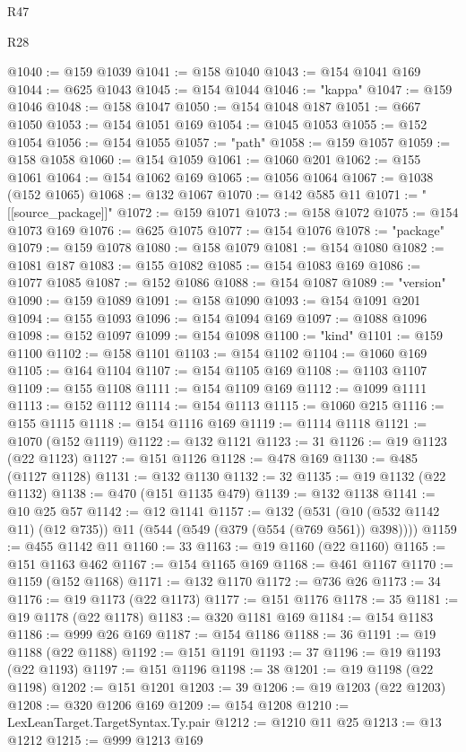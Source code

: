 \begin{lexlean}{R47}
\begin{lexlean}{R28}
\begin{coremodule}
{{{{{{{{{{{{{{{{{{{{{{{{{{{{{{{{{{{{{{{{{{{{{{{{{{{{{{{{{{{{{{{{{{{{{{{{{{{{{{{{{{{{{{{{{{{{{{{{{{{{{{{{{{{{{{{{{{{{{{{{{{{{{{{{{{{{{@1040 := @159 @1039
@1041 := @158 @1040
@1043 := @154 @1041 @169
@1044 := @625 @1043
@1045 := @154 @1044
@1046 := "kappa"
@1047 := @159 @1046
@1048 := @158 @1047
@1050 := @154 @1048 @187
@1051 := @667 @1050
@1053 := @154 @1051 @169
@1054 := @1045 @1053
@1055 := @152 @1054
@1056 := @154 @1055
@1057 := "path"
@1058 := @159 @1057
@1059 := @158 @1058
@1060 := @154 @1059
@1061 := @1060 @201
@1062 := @155 @1061
@1064 := @154 @1062 @169
@1065 := @1056 @1064
@1067 := @1038 (@152 @1065)
@1068 := @132 @1067
@1070 := @142 @585 @11
@1071 := "[[source_package]]"
@1072 := @159 @1071
@1073 := @158 @1072
@1075 := @154 @1073 @169
@1076 := @625 @1075
@1077 := @154 @1076
@1078 := "package"
@1079 := @159 @1078
@1080 := @158 @1079
@1081 := @154 @1080
@1082 := @1081 @187
@1083 := @155 @1082
@1085 := @154 @1083 @169
@1086 := @1077 @1085
@1087 := @152 @1086
@1088 := @154 @1087
@1089 := "version"
@1090 := @159 @1089
@1091 := @158 @1090
@1093 := @154 @1091 @201
@1094 := @155 @1093
@1096 := @154 @1094 @169
@1097 := @1088 @1096
@1098 := @152 @1097
@1099 := @154 @1098
@1100 := "kind"
@1101 := @159 @1100
@1102 := @158 @1101
@1103 := @154 @1102
@1104 := @1060 @169
@1105 := @164 @1104
@1107 := @154 @1105 @169
@1108 := @1103 @1107
@1109 := @155 @1108
@1111 := @154 @1109 @169
@1112 := @1099 @1111
@1113 := @152 @1112
@1114 := @154 @1113
@1115 := @1060 @215
@1116 := @155 @1115
@1118 := @154 @1116 @169
@1119 := @1114 @1118
@1121 := @1070 (@152 @1119)
@1122 := @132 @1121
@1123 := 31
@1126 := @19 @1123 (@22 @1123)
@1127 := @151 @1126
@1128 := @478 @169
@1130 := @485 (@1127 @1128)
@1131 := @132 @1130
@1132 := 32
@1135 := @19 @1132 (@22 @1132)
@1138 := @470 (@151 @1135 @479)
@1139 := @132 @1138
@1141 := @10 @25 @57
@1142 := @12 @1141
@1157 := @132
    (@531 (@10 (@532 @1142 @11) (@12 @735)) @11 (@544 (@549 (@379 (@554 (@769 @561)) @398))))
@1159 := @455 @1142 @11
@1160 := 33
@1163 := @19 @1160 (@22 @1160)
@1165 := @151 @1163 @462
@1167 := @154 @1165 @169
@1168 := @461 @1167
@1170 := @1159 (@152 @1168)
@1171 := @132 @1170
@1172 := @736 @26
@1173 := 34
@1176 := @19 @1173 (@22 @1173)
@1177 := @151 @1176
@1178 := 35
@1181 := @19 @1178 (@22 @1178)
@1183 := @320 @1181 @169
@1184 := @154 @1183
@1186 := @999 @26 @169
@1187 := @154 @1186
@1188 := 36
@1191 := @19 @1188 (@22 @1188)
@1192 := @151 @1191
@1193 := 37
@1196 := @19 @1193 (@22 @1193)
@1197 := @151 @1196
@1198 := 38
@1201 := @19 @1198 (@22 @1198)
@1202 := @151 @1201
@1203 := 39
@1206 := @19 @1203 (@22 @1203)
@1208 := @320 @1206 @169
@1209 := @154 @1208
@1210 := LexLeanTarget.TargetSyntax.Ty.pair
@1212 := @1210 @11 @25
@1213 := @13 @1212
@1215 := @999 @1213 @169
}}}}}}}}}}}}}}}}}}}}}}}}}}}}}}}}}}}}}}}}}}}}}}}}}}}}}}}}}}}}}}}}}}}}}}}}}}}}}}}}}}}}}}}}}}}}}}}}}}}}}}}}}}}}}}}}}}}}}}}}}}}}}}}}}}}}}
\end{coremodule}
\end{lexlean}
\end{lexlean}
